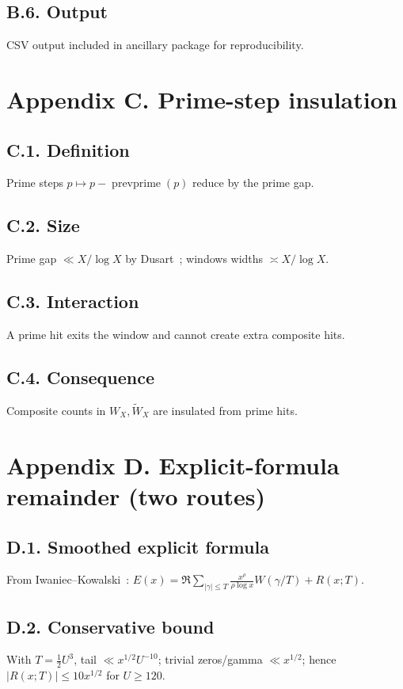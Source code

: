\documentclass[11pt]{article}
\theoremstyle{plain}
\theoremstyle{definition}
\theoremstyle{remark}
\begin{document}
\subsection*{B.6. Output}
CSV output included in ancillary package for reproducibility.

\section*{Appendix C. Prime-step insulation}\label{app:primeins}

\subsection*{C.1. Definition}
Prime steps $p\mapsto p-\operatorname{prevprime}(p)$ reduce by the prime gap.

\subsection*{C.2. Size}
Prime gap $\ll X/\log X$ by Dusart~\cite[Theorem~1.10]{Dusart2010}; windows widths $\asymp X/\log X$.

\subsection*{C.3. Interaction}
A prime hit exits the window and cannot create extra composite hits.

\subsection*{C.4. Consequence}
Composite counts in $W_X,\widetilde W_X$ are insulated from prime hits.

\section*{Appendix D. Explicit-formula remainder (two routes)}\label{app:explicitrem}

\subsection*{D.1. Smoothed explicit formula}
From Iwaniec--Kowalski~\cite[Theorem~5.12]{IwaniecKowalski}:
\(
E(x)=\Re\sum_{|\gamma|\le T}\frac{x^\rho}{\rho\log x}W(\gamma/T)+R(x;T).
\)

\subsection*{D.2. Conservative bound}
With $T=\tfrac12 U^3$, tail $\ll x^{1/2}U^{-10}$; trivial zeros/gamma $\ll x^{1/2}$; hence $|R(x;T)|\le 10x^{1/2}$ for $U\ge 120$.
\end{document}
